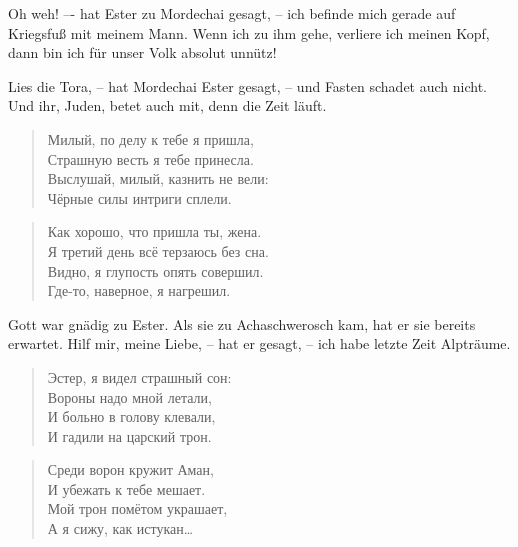 \documentclass[12pt,a4paper,titlepage]{article}
\begin{document}
\begin{drama}
\uespeaks
Oh weh! –- hat Ester zu Mordechai gesagt, -- ich befinde mich
gerade auf Kriegsfuß mit meinem Mann. Wenn ich zu ihm gehe,
verliere ich meinen Kopf, dann bin ich für unser Volk absolut unnütz!

Lies die Tora, -- hat Mordechai Ester gesagt, -- und Fasten
schadet auch nicht. Und ihr, Juden, betet auch mit, denn die Zeit läuft.


\scene


\espeaks {}
\begin{verse}
Милый, по делу к тебе я пришла,\\
Страшную весть я тебе принесла.\\
Выслушай, милый, казнить не вели:\\
Чёрные силы интриги сплели.\\
\end{verse}

\ahspeaks {}
\begin{verse}
Как хорошо, что пришла ты, жена.\\
Я третий день всё терзаюсь без сна.\\
Видно, я глупость опять совершил.\\
Где-то, наверное, я нагрешил.\\
\end{verse}


\uespeaks
Gott war gnädig zu Ester. Als sie zu Achaschwerosch kam, hat er sie
bereits erwartet. Hilf mir, meine Liebe, -- hat er gesagt, -- ich habe letzte Zeit Alpträume.


\ahspeaks {}
\begin{verse}
Эстер, я видел страшный сон:\\
Вороны надо мной летали,\\
И больно в голову клевали,\\
И гадили на царский трон.\\
\end{verse}

\begin{verse}
Среди ворон кружит Аман,\\
И убежать к тебе мешает.\\
Мой трон помётом украшает,\\
А я сижу, как истукан\ldots\\
\end{verse}


\end{drama}
\end{document}
